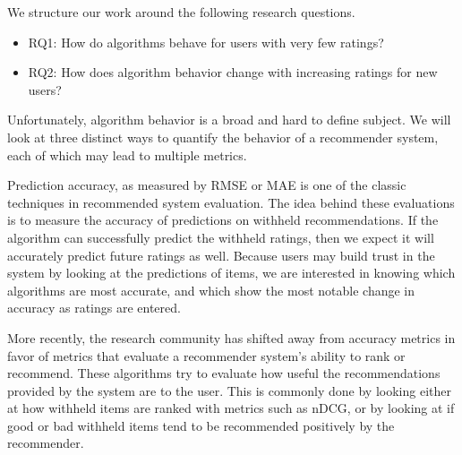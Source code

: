 \documentclass[letterpaper]{sig-alternate}
\begin{document}
  We structure our work around the following research questions.
  \begin{itemize}
    \item RQ1: How do algorithms behave for users with very few ratings?
    \item RQ2: How does algorithm behavior change with increasing ratings for new users?
  \end{itemize}
  Unfortunately, algorithm behavior is a broad and hard to define subject.
  We will look at three distinct ways to quantify the behavior of a recommender system, each of which may lead to multiple metrics.

      

  Prediction accuracy, as measured by RMSE or MAE is one of the classic techniques in recommended system evaluation.
  The idea behind these evaluations is to measure the accuracy of predictions on withheld recommendations.
  If the algorithm can successfully predict the withheld ratings, then we expect it will accurately predict future ratings as well.
  Because users may build trust in the system by looking at the predictions of items, we are interested in knowing which algorithms are most accurate, and which show the most notable change in accuracy as ratings are entered.
  
  More recently, the research community has shifted away from accuracy metrics in favor of metrics that evaluate a recommender system's ability to rank or recommend.
  These algorithms try to evaluate how useful the recommendations provided by the system are to the user.
  This is commonly done by looking either at how withheld items are ranked with metrics such as nDCG, or by looking at if good or bad withheld items tend to be recommended positively by the recommender.
\end{document}
